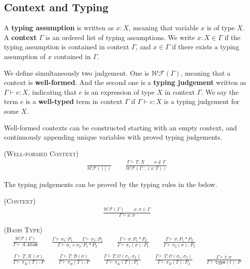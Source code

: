 \documentclass[manuscript, review, timestamp]{acmart}
\newcommand*{\K}{\mathcal{K}}
\newcommand*{\B}{\mathcal{B}}
\newcommand*{\Op}{\mathcal{O}}
\newcommand*{\type}{\texttt{type}}
\begin{document}
\subsection{Context and Typing}

\begin{definition}[context]
  A \textbf{typing assumption} is written as $x : X$, meaning that variable $x$ is of type $X$. A \textbf{context} $\Gamma$ is an ordered list of typing assumptions. We write $x : X \in \Gamma$ if the typing assumption is contained in context $\Gamma$, and $x \in \Gamma$ if there exists a typing assumption of $x$ contained in $\Gamma$.
\end{definition}


We define simultaneously two judgement. One is $\mathcal{WF}(\Gamma)$, meaning that a context is \textbf{well-formed}. And the second one is a \textbf{typing judgement} written as $\Gamma \vdash e : X$, indicating that $e$ is an expression of type $X$ in context $\Gamma$.
We say the term $e$ is a \textbf{well-typed} term in context $\Gamma$ if $\Gamma \vdash e : X$ is a typing judgement for some $X$.

Well-formed contexts can be constructed starting with an empty context, and continuously appending unique variables with proved typing judgements.

\textsc{(Well-formed Context)}
\begin{gather*}
  \frac{}{\mathcal{WF}([])}
  \qquad
  \frac{\Gamma \vdash T : X \qquad x \notin \Gamma}{\mathcal{WF}(\Gamma :: (x : T))}
\end{gather*}

The typing judgements can be proved by the typing rules in the below.

\textsc{(Context)}
\begin{gather*}
  \frac{\mathcal{WF}(\Gamma) \qquad x : \sigma \in \Gamma}{\Gamma \vdash x : \sigma}
\end{gather*}

\textsc{(Basis Type)}
\begin{gather*}
  \frac{\mathcal{WF}(\Gamma)}{\Gamma \vdash A : \texttt{Atom} }
  \qquad
  \frac{\Gamma \vdash \sigma_1 : P_1 \qquad \Gamma \vdash \sigma_2 : P_2}{\Gamma \vdash \sigma_1 \times \sigma_2 : P_1 * P_2}
  \qquad
  \frac{\Gamma \vdash \sigma : P_1 * P_2}{\Gamma \vdash \pi_1(\sigma) : P_1}
  \qquad
  \frac{\Gamma \vdash \sigma : P_1 * P_2}{\Gamma \vdash \pi_2(\sigma) : P_2} \\
  \\
  \frac{\Gamma \vdash T : \K(\sigma)}{\Gamma \vdash \pi_K(T) : P}
  \qquad
  \frac{\Gamma \vdash T : \B(\sigma)}{\Gamma \vdash \pi_B(T) : P} \qquad
  \frac{\Gamma \vdash T : \Op(\sigma_1, \sigma_2)}{\Gamma \vdash \pi_K(T) : P_1}
  \qquad
  \frac{\Gamma \vdash T : \Op(\sigma_1, \sigma_2)}{\Gamma \vdash \pi_B(T) : P_2}
  \qquad
  \frac{\Gamma \vdash t : \sigma}{\Gamma \vdash \type(t) : P}
\end{gather*}
\end{document}
